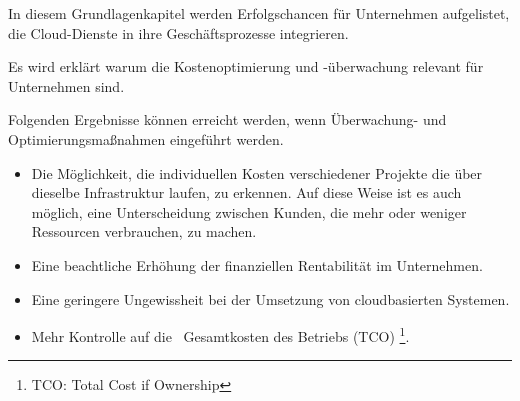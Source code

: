 In diesem Grundlagenkapitel werden Erfolgschancen für Unternehmen aufgelistet, die Cloud-Dienste in ihre Geschäftsprozesse integrieren.
\\
\begin{flushleft}
      Es wird erklärt warum die Kostenoptimierung und -überwachung relevant für Unternehmen sind.
\end{flushleft}
Folgenden Ergebnisse können erreicht werden, wenn Überwachung- und Optimierungsmaßnahmen eingeführt werden.
\begin{itemize}
      \item
            Die Möglichkeit, die individuellen Kosten verschiedener Projekte die über dieselbe Infrastruktur laufen, zu erkennen. Auf diese Weise ist es auch möglich, eine Unterscheidung zwischen Kunden, die mehr oder weniger Ressourcen verbrauchen, zu machen.
      \item
            Eine beachtliche Erhöhung der finanziellen Rentabilität im Unternehmen.
      \item
            Eine geringere Ungewissheit bei der Umsetzung von cloudbasierten Systemen.
      \item
            Mehr Kontrolle auf die  Gesamtkosten des Betriebs (TCO)
            \footnote{TCO: Total Cost if Ownership}.
            
\end{itemize}




